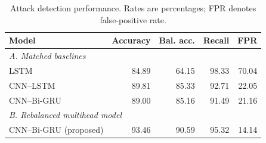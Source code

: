 \begin{table}[!t]
\centering
\caption{Attack detection performance. Rates are percentages; FPR denotes false-positive rate. }
\label{tab:comparison}
\setlength{\tabcolsep}{3pt}
\small
\begin{tabular}{lrrrr}
\toprule
Model & Accuracy & Bal. acc. & Recall & FPR \\
\midrule
\multicolumn{5}{l}{\textit{A. Matched baselines}} \\
LSTM & 84.89 & 64.15 & 98.33 & 70.04 \\
CNN--LSTM & 89.81 & 85.33 & 92.71 & 22.05 \\
CNN--Bi-GRU & 89.00 & 85.16 & 91.49 & 21.16 \\
\midrule
\multicolumn{5}{l}{\textit{B. Rebalanced multihead model}} \\
CNN--Bi-GRU (proposed) & 93.46 & 90.59 & 95.32 & 14.14 \\
\bottomrule
\end{tabular}
\end{table}
